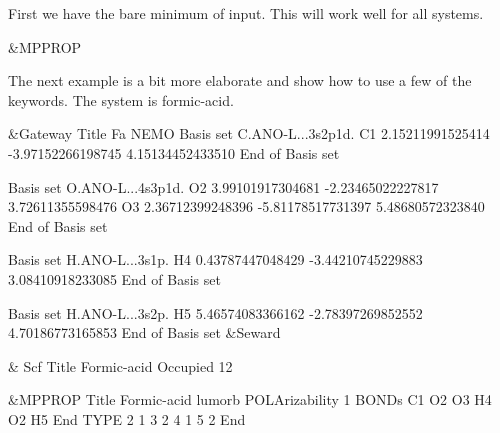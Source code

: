 First we have the bare minimum of input. This will work well for all systems.

\begin{inputlisting}
 &MPPROP
\end{inputlisting}

The next example is a bit more elaborate and show how to use
a few of the keywords. The system is formic-acid.

\begin{inputlisting}
 &Gateway
Title
Fa
NEMO
Basis set
C.ANO-L...3s2p1d.
C1      2.15211991525414     -3.97152266198745      4.15134452433510
End of Basis set

Basis set
O.ANO-L...4s3p1d.
O2     3.99101917304681     -2.23465022227817      3.72611355598476
O3     2.36712399248396     -5.81178517731397      5.48680572323840
End of Basis set

Basis set
H.ANO-L...3s1p.
H4      0.43787447048429     -3.44210745229883      3.08410918233085
End of Basis set

Basis set
H.ANO-L...3s2p.
H5     5.46574083366162     -2.78397269852552      4.70186773165853
End of Basis set
 &Seward

& Scf
Title
Formic-acid
Occupied
  12

 &MPPROP
Title
Formic-acid
lumorb
POLArizability
1
BONDs
C1 O2 O3 H4
O2 H5
End
TYPE
2 1
3 2
4 1
5 2
End
\end{inputlisting}


